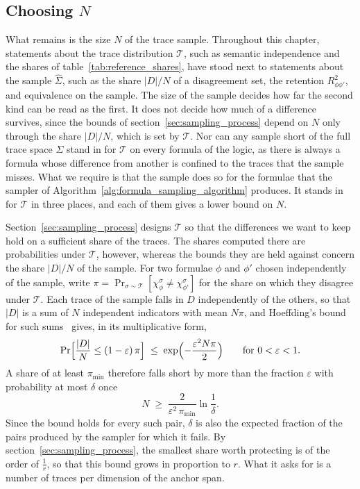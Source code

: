 \documentclass[titlepage,a4paper,11pt]{report}
\begin{document}
    \subsection{Choosing $N$}\label{sec:choosing_n}
    What remains is the size $N$ of the trace sample. Throughout this chapter, statements about the trace distribution $\mathcal T$, such as semantic independence and the shares of table~\ref{tab:reference_shares}, have stood next to statements about the sample $\widehat\Sigma$, such as the share $|D|/N$ of a disagreement set, the retention $R^2_{\phi\phi'}$, and equivalence on the sample. The size of the sample decides how far the second kind can be read as the first. It does not decide how much of a difference survives, since the bounds of section~\ref{sec:sampling_process} depend on $N$ only through the share $|D|/N$, which is set by $\mathcal T$. Nor can any sample short of the full trace space $\Sigma$ stand in for $\mathcal T$ on every formula of the logic, as there is always a formula whose difference from another is confined to the traces that the sample misses. What we require is that the sample does so for the formulae that the sampler of Algorithm~\ref{alg:formula_sampling_algorithm} produces. It stands in for $\mathcal T$ in three places, and each of them gives a lower bound on $N$.
 
    Section~\ref{sec:sampling_process} designs $\mathcal T$ so that the differences we want to keep hold on a sufficient share of the traces. The shares computed there are probabilities under $\mathcal T$, however, whereas the bounds they are held against concern the share $|D|/N$ of the sample. For two formulae $\phi$ and $\phi'$ chosen independently of the sample, write $\pi=\Pr_{\sigma\sim\mathcal T}[\chi^\sigma_\phi\neq\chi^\sigma_{\phi'}]$ for the share on which they disagree under $\mathcal T$. Each trace of the sample falls in $D$ independently of the others, so that $|D|$ is a sum of $N$ independent indicators with mean $N\pi$, and Hoeffding's bound for such sums~\citep[Theorem~1]{hoeffding_probability_1963} gives, in its multiplicative form,
    \begin{equation}\label{eq:share_shortfall}
        \Pr\Bigl[\frac{|D|}{N}\le(1-\varepsilon)\,\pi\Bigr]\;\le\;\exp\Bigl(-\frac{\varepsilon^2N\pi}{2}\Bigr)\qquad\text{for } 0<\varepsilon<1 .
    \end{equation}
    A share of at least $\pi_{\min}$ therefore falls short by more than the fraction $\varepsilon$ with probability at most $\delta$ once
    \begin{equation}\label{eq:n_shares}
        N\;\ge\;\frac{2}{\varepsilon^2\,\pi_{\min}}\ln\frac1\delta .
    \end{equation}
    Since the bound holds for every such pair, $\delta$ is also the expected fraction of the pairs produced by the sampler for which it fails. By section~\ref{sec:sampling_process}, the smallest share worth protecting is of the order of $\frac1r$, so that this bound grows in proportion to $r$. What it asks for is a number of traces per dimension of the anchor span.
 
\end{document}
